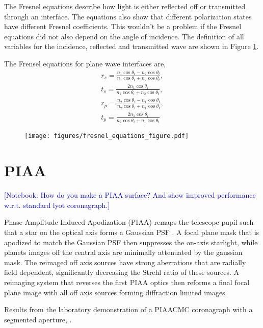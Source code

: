 \documentclass[letterpaper]{ar-1col}
\newcommand{\notebooksuggestion}[1]{\textcolor{blue}{[Notebook: #1]}}
\begin{document}
The Fresnel equations describe how light is either reflected off or transmitted through an interface. The equations also show that different polarization states have different Fresnel coefficients. This wouldn't be a problem if the Fresnel equations did not also depend on the angle of incidence. The definition of all variables for the incidence, reflected and transmitted wave are shown in Figure \ref{fig:fresnel_equations}.

The Frensel equations for plane wave interfaces are,
\begin{align}
r_s = \frac{n_1\cos{\theta_i} - n_2\cos{\theta_t}}{n_1\cos{\theta_i} + n_2\cos{\theta_t}},\\
t_s = \frac{2n_1 \cos{\theta_i}}{n_1\cos{\theta_i} + n_2\cos{\theta_t}},\\
r_p = \frac{n_2\cos{\theta_i} - n_1\cos{\theta_t}}{n_2\cos{\theta_i} + n_1\cos{\theta_t}},\\
t_p = \frac{2n_1 \cos{\theta_i}}{n_2\cos{\theta_i} + n_1\cos{\theta_t}}
\end{align}

\begin{figure}[ht]
  \centering
  \texttt{[image: figures/fresnel\_equations\_figure.pdf]}
  \caption{}
  \label{fig:fresnel_equations}
\end{figure}

\section{PIAA}\label{sec:piaa}

\notebooksuggestion{How do you make a PIAA surface? And show improved performance w.r.t. standard lyot coronagraph.}

Phase Amplitude Induced Apodization (PIAA) remaps the telescope pupil such that a star on the optical axis forms a Gaussian PSF \citep{Guyon03,Guyon05,Guyon14}.
%
A focal plane mask that is apodized to match the Gaussian PSF then suppresses the on-axis starlight, while planets images off the central axis are minimally attenuated by the gaussian mask.
%
The reimaged off axis sources have strong aberrations that are radially field dependent, significantly decreasing the Strehl ratio of these sources.
%
A reimaging system that reverses the first PIAA optics then reforms a final focal plane image with all off axis sources forming diffraction limited images.

Results from the laboratory demonstration of a PIAACMC coronagraph with a segmented aperture, \citep{Marx21}.
\end{document}
